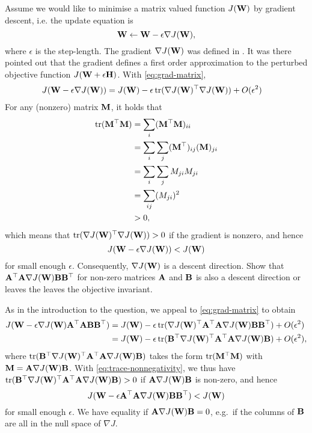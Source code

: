 \label{ex:descent-directions-for-matrix-valued-functions}
Assume we would like to minimise a matrix valued function $J(\mathbf{W})$ by gradient
descent, i.e. the update equation is
\begin{equation}
  \mathbf{W} \leftarrow \mathbf{W} - \epsilon \nabla J(\mathbf{W}),
\end{equation}
where $\epsilon$ is the step-length. The gradient $\nabla J(\mathbf{W})$ was defined in
. It was there pointed out that the gradient defines a
first order approximation to the perturbed objective function $J(\mathbf{W}+\epsilon
\mathbf{H})$. With \eqref{eq:grad-matrix},
\begin{align}
  J(\mathbf{W} - \epsilon \nabla J(\mathbf{W})) & = J(\mathbf{W}) - \epsilon \operatorname{tr}(\nabla J(\mathbf{W})^\top \nabla J(\mathbf{W})) + O(\epsilon^2)
\end{align}
For any (nonzero) matrix $\mathbf{M}$, it holds that
\begin{align}
  \operatorname{tr}(\mathbf{M}^\top \mathbf{M}) &= \sum_{i} (\mathbf{M}^\top\mathbf{M})_{ii}\\
                  &= \sum_i \sum_j (\mathbf{M}^\top)_{ij} (\mathbf{M})_{ji}\\
                  &= \sum_i \sum_j M_{ji} M_{ji}\\
                  &= \sum_{ij} (M_{ji})^2\\
                  &> 0, \label{eq:trace-nonnegativity}
\end{align}
which means that $\operatorname{tr}(\nabla J(\mathbf{W})^\top \nabla J(\mathbf{W})) > 0$ if the gradient is nonzero, and hence
\begin{equation}
  J(\mathbf{W} - \epsilon \nabla J(\mathbf{W})) < J(\mathbf{W})
\end{equation}
for small enough $\epsilon$. Consequently, $\nabla J(\mathbf{W})$ is a descent
direction. Show that $\mathbf{A}^\top \mathbf{A} \nabla J(\mathbf{W})\mathbf{B}\mathbf{B}^\top$ for non-zero matrices
$\mathbf{A}$ and $\mathbf{B}$ is also a descent direction or leaves the leaves the objective invariant.

\begin{solution}
  As in the introduction to the question, we appeal to \eqref{eq:grad-matrix} to
  obtain
  \begin{align}
    J(\mathbf{W} - \epsilon \nabla J(\mathbf{W})\mathbf{A}^\top\mathbf{A} \mathbf{B}\mathbf{B}^\top) & = J(\mathbf{W}) - \epsilon \operatorname{tr}(\nabla J(\mathbf{W})^\top \mathbf{A}^\top \mathbf{A} \nabla J(\mathbf{W})\mathbf{B}\mathbf{B}^\top) + O(\epsilon^2)\\
                                                     & =  J(\mathbf{W}) - \epsilon \operatorname{tr}(\mathbf{B}^\top \nabla J(\mathbf{W})^\top \mathbf{A}^\top \mathbf{A} \nabla J(\mathbf{W})\mathbf{B}) + O(\epsilon^2),
  \end{align}
  where $\operatorname{tr}(\mathbf{B}^\top \nabla J(\mathbf{W})^\top\mathbf{A}^\top \mathbf{A} \nabla J(\mathbf{W})\mathbf{B})$ takes the form
  $\operatorname{tr}(\mathbf{M}^\top \mathbf{M})$ with $\mathbf{M}= \mathbf{A} \nabla J(\mathbf{W})\mathbf{B}$. With
  \eqref{eq:trace-nonnegativity}, we thus have $\operatorname{tr}(\mathbf{B}^\top \nabla J(\mathbf{W})^\top \mathbf{A}^\top
  \mathbf{A} \nabla J(\mathbf{W})\mathbf{B}) > 0$ if $\mathbf{A} \nabla J(\mathbf{W})\mathbf{B}$ is non-zero, and hence
  \begin{equation}
    J(\mathbf{W} - \epsilon \mathbf{A}^\top \mathbf{A} \nabla J(\mathbf{W}) \mathbf{B}\mathbf{B}^\top) < J(\mathbf{W})
  \end{equation}
  for small enough $\epsilon$. We have equality if $\mathbf{A} \nabla J(\mathbf{W})\mathbf{B} = 0$,
  e.g.\ if the columns of $\mathbf{B}$ are all in the null space of $\nabla J$.
\end{solution}






